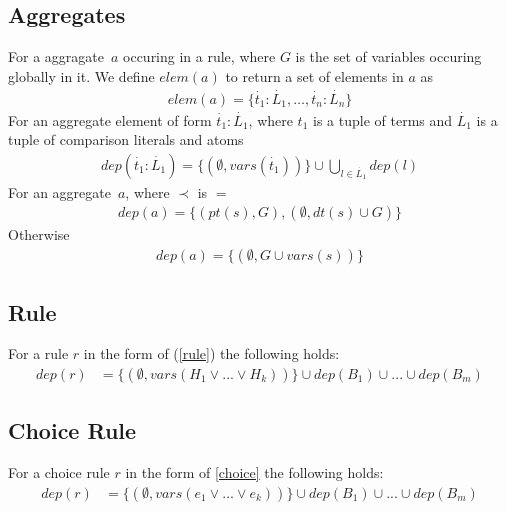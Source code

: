 \documentclass{article}
\newcommand{\tuple}[1]{\dot{#1}}
\newcommand{\set}[1]{\{#1\}}
\begin{document}
	\subsection{Aggregates}
	For a aggragate~$a$ occuring in a rule, where $G$ is the set of variables occuring globally in it.
	We define $elem(a)$ to return a set of elements in $a$ as
	\begin{align*}
		elem(a) = \set{\tuple{t_1} : \tuple{L_1}, \dots , \tuple{t_n} : \tuple{L_n}}
	\end{align*}
	For an aggregate element of form $\tuple{t_1} : \tuple{L_1}$, where $t_1$ is a tuple of terms and $\tuple{L_1}$ is a tuple of comparison literals and atoms
	\begin{align*}
		dep(\tuple{t_1} : \tuple{L_1}) = \set{(\emptyset, vars(\tuple{t_1}))} \cup \bigcup_{l \in \tuple{L_1}} dep(l)
	\end{align*}
	For an aggregate~$a$, where $\prec$ is $=$
	\begin{align*}
		dep(a) = \set{(pt(s), G), (\emptyset, dt(s) \cup G)}
	\end{align*}
	Otherwise
	\begin{align*}
		dep(a) = \set{(\emptyset, G \cup vars(s))}
	\end{align*}

	\subsection{Rule}
	For a rule $r$ in the form of (\ref{rule}) the following holds:
	\begin{align*}
		dep(r) &= \set{(\emptyset, vars(H_1\vee ... \vee H_k))} \cup dep(B_1) \cup ... \cup dep(B_m)
	\end{align*}

	\subsection{Choice Rule}
	For a choice rule $r$ in the form of \eqref{choice} the following holds:
	\begin{align*}
		dep(r) &= \set{(\emptyset, vars(e_1\vee ... \vee e_k))} \cup dep(B_1) \cup ... \cup dep(B_m)
	\end{align*}
\end{document}
